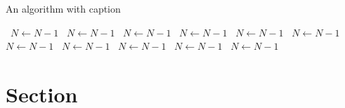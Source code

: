 \documentclass[a4paper]{article}
\begin{document}
\begin{algorithm}
\caption{An algorithm with caption}
\begin{algorithmic}
\    \State $N \gets N - 1$
\    \State $N \gets N - 1$
\    \State $N \gets N - 1$
\    \State $N \gets N - 1$
\    \State $N \gets N - 1$
\    \State $N \gets N - 1$
\    \State $N \gets N - 1$
\    \State $N \gets N - 1$
\    \State $N \gets N - 1$
\    \State $N \gets N - 1$
\    \State $N \gets N - 1$
\EndWhile
\end{algorithmic}
\end{algorithm}

\section{Section}
\end{document}
